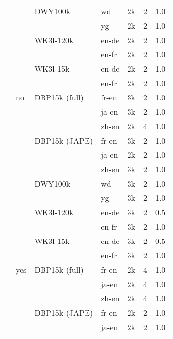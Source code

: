 \documentclass[runningheads]{llncs}
\begin{document}
\begin{table}
\begin{tabular*}{\linewidth}{*{4}{l}*{3}{@{\extracolsep{\fill}}r}@{\extracolsep{\fill}}}
                 &     & DWY100k & wd &         2k &         2 &   1.0 \\
                 &     &         & yg &         2k &         2 &   1.0 \\
                 &     & WK3l-120k & en-de &         2k &         2 &   1.0 \\
                 &     &         & en-fr &         2k &         2 &   1.0 \\
                 &     & WK3l-15k & en-de &         2k &         2 &   1.0 \\
                 &     &         & en-fr &         2k &         2 &   1.0 \\
         & no & DBP15k (full) & fr-en &         3k &         2 &   1.0 \\
                 &     &         & ja-en &         3k &         2 &   1.0 \\
                 &     &         & zh-en &         2k &         4 &   1.0 \\
                 &     & DBP15k (JAPE) & fr-en &         3k &         2 &   1.0 \\
                 &     &         & ja-en &         2k &         2 &   1.0 \\
                 &     &         & zh-en &         3k &         2 &   1.0 \\
                 &     & DWY100k & wd &         3k &         2 &   1.0 \\
                 &     &         & yg &         3k &         2 &   1.0 \\
                 &     & WK3l-120k & en-de &         3k &         2 &   0.5 \\
                 &     &         & en-fr &         3k &         2 &   1.0 \\
                 &     & WK3l-15k & en-de &         3k &         2 &   0.5 \\
                 &     &         & en-fr &         3k &         2 &   1.0 \\
                 & yes & DBP15k (full) & fr-en &         2k &         4 &   1.0 \\
                 &     &         & ja-en &         2k &         4 &   1.0 \\
                 &     &         & zh-en &         2k &         4 &   1.0 \\
                 &     & DBP15k (JAPE) & fr-en &         2k &         2 &   1.0 \\
                 &     &         & ja-en &         2k &         2 &   1.0 \\

\end{tabular*}
\end{table}
\end{document}
